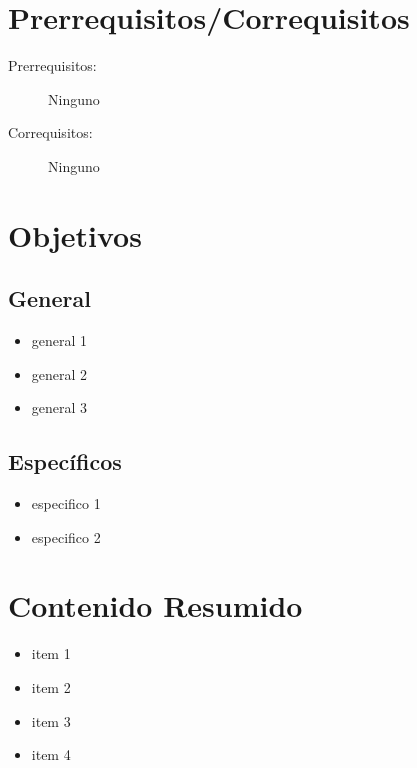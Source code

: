 \documentclass[11pt]{article}
\begin{document}
\section*{Prerrequisitos/Correquisitos}
\begin{description}
\item [Prerrequisitos:] Ninguno
\item[Correquisitos:] Ninguno
\end{description}

\section*{Objetivos}

\subsection*{General}

\begin{itemize}
\item general 1 \item general 2  \item general 3 
\end{itemize}

\subsection*{Específicos}

\begin{itemize}
\item especifico 1 \item especifico 2  
\end{itemize}

\section*{Contenido Resumido}

\begin{itemize}
\item item 1 \item  item 2  \item  item 3  \item  item 4  
\end{itemize}

\end{document}
